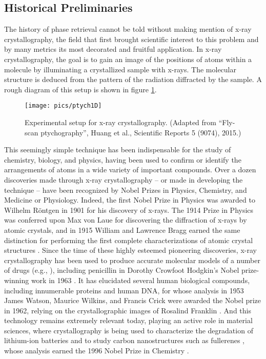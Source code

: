 \subsection{Historical Preliminaries}

The history of phase retrieval cannot be told without making mention of x-ray crystallography, the field that first brought scientific interest to this problem and by many metrics its most decorated and fruitful application.  In x-ray crystallography, the goal is to gain an image of the positions of atoms within a molecule by illuminating a crystallized sample with x-rays.  The molecular structure is deduced from the pattern of the radiation diffracted by the sample.  A rough diagram of this setup is shown in figure \ref{fig:xray_cryst}.

\begin{figure}
  \centering\texttt{[image: pics/ptych1D]}
  \caption[Experimental setup for x-ray crystallography]
          {Experimental setup for x-ray crystallography.   {\small
              (Adapted from ``Fly-scan ptychography'', Huang et al.,
              Scientific Reports 5 (9074), 2015.)}}
  \label{fig:xray_cryst}
\end{figure}

This seemingly simple technique has been indispensable for the study of chemistry, biology, and physics, having been used to confirm or identify the arrangements of atoms in a wide variety of important compounds.  Over a dozen discoveries made through x-ray crystallography -- or made in developing the technique -- have been recognized by Nobel Prizes in Physics, Chemistry, and Medicine or Physiology.  Indeed, the first Nobel Prize in Physics was awarded to Wilhelm R\"ontgen in 1901 for his discovery of x-rays.  The 1914 Prize in Physics was conferred upon Max von Laue for discovering the diffraction of x-rays by atomic crystals, and in 1915 William and Lawrence Bragg earned the same distinction for performing the first complete characterizations of atomic crystal structures \cite{galli2014nobel}.  Since the time of these highly esteemed pioneering discoveries, x-ray crystallography has been used to produce accurate molecular models of a number of drugs (e.g., \cite{cell2001antibios, rasmussen2007adrenergic, schindler2000kinase}), including penicillin in Dorothy Crowfoot Hodgkin's Nobel prize-winning work in 1963 \cite{hodgkin1963penicillin}.  It has elucidated several human biological compounds, including innumerable proteins \cite{kimber2003protein, varsani1993isomerase} and human DNA, for whose analysis in 1953 James Watson, Maurice Wilkins, and Francis Crick were awarded the Nobel prize in 1962, relying on the crystallographic images of Rosalind Franklin \cite{franklin1953nature,watson1962nobel_lecture,watson1953nature,wilkins1953nature}.  And this technology remains extremely relevant today, playing an active role in material sciences, where crystallography is being used to characterize the degradation of lithium-ion batteries \cite{hausbrand2015battery, andrej2018battery} and to study carbon nanostructures such as fullerenes \cite{lamb1990carbon, kroto1985fullerene}, whose analysis earned the 1996 Nobel Prize in Chemistry \cite{galli2014nobel}.

